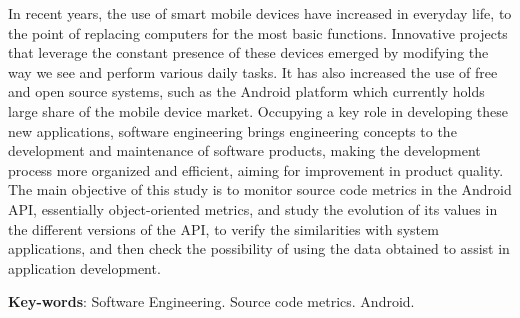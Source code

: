 \begin{resumo}[Abstract]
  
In recent years, the use of smart mobile devices have increased in everyday life, to the point of replacing computers for the most basic functions. Innovative projects that leverage the constant presence of these devices emerged by modifying the way we see and perform various daily tasks. It has also increased the use of free and open source systems, such as the Android platform which currently holds large share of the mobile device market. Occupying a key role in developing these new applications, software engineering brings engineering concepts to the development and maintenance of software products, making the development process more organized and efficient, aiming for improvement in product quality. The main objective of this study is to monitor source code metrics in the Android API, essentially object-oriented metrics, and study the evolution of its values in the different versions of the API, to verify the similarities with system applications, and then check the possibility of using the data obtained to assist in application development.
   \vspace{\onelineskip}
 
  \noindent 
  \textbf{Key-words}: Software Engineering. Source code metrics. Android.
\end{resumo}
